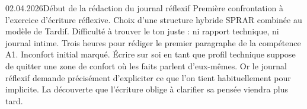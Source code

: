 \begin{jbentry}{02.04.2026}{Début de la rédaction du journal réflexif}{}
\jbobs
Première confrontation à l'exercice d'écriture réflexive. Choix d'une structure hybride SPRAR combinée au modèle de Tardif. Difficulté à trouver le ton juste : ni rapport technique, ni journal intime. Trois heures pour rédiger le premier paragraphe de la compétence A1.
\jbres
Inconfort initial marqué. Écrire sur soi en tant que profil technique suppose de quitter une zone de confort où les faits parlent d'eux-mêmes. Or le journal réflexif demande précisément d'expliciter ce que l'on tient habituellement pour implicite. La découverte que l'écriture oblige à clarifier sa pensée viendra plus tard.
\end{jbentry}

\clearpage
\ClearShipoutPictureBG